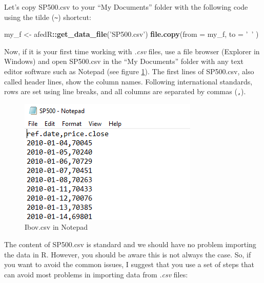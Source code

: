 \documentclass[
  12pt,
]{book}
\newenvironment{Shaded}{\begin{snugshade}}{\end{snugshade}}
\newcommand{\DataTypeTok}[1]{\textcolor[rgb]{0.27,0.27,0.27}{#1}}
\newcommand{\KeywordTok}[1]{\textcolor[rgb]{0.27,0.27,0.27}{\textbf{#1}}}
\newcommand{\NormalTok}[1]{#1}
\newcommand{\OperatorTok}[1]{\textcolor[rgb]{0.43,0.43,0.43}{\textbf{#1}}}
\newcommand{\StringTok}[1]{\textcolor[rgb]{0.5,0.5,0.5}{#1}}
\begin{document}
Let's copy SP500.csv to your ``My Documents'' folder with the following code using the tilde (\texttt{\textasciitilde{}}) shortcut:

\begin{Shaded}
\begin{Highlighting}[]
\NormalTok{my_f <-}\StringTok{ }\NormalTok{afedR}\OperatorTok{::}\KeywordTok{get_data_file}\NormalTok{(}\StringTok{'SP500.csv'}\NormalTok{)}
\KeywordTok{file.copy}\NormalTok{(}\DataTypeTok{from =}\NormalTok{ my_f, }\DataTypeTok{to =} \StringTok{'~'}\NormalTok{ )}
\end{Highlighting}
\end{Shaded}

Now, if it is your first time working with \emph{.csv} files, use a file browser (Explorer in Windows) and open SP500.csv in the ``My Documents'' folder with any text editor software such as Notepad (see figure \ref{fig:notepad}). The first lines of SP500.csv, also called header lines, show the column names. Following international standards, rows are set using line breaks, and all columns are separated by commas (\texttt{,}).

\begin{figure}[!htbp]

{\centering \includegraphics[width=1\linewidth]{figs/example_csv_notepad} 

}

\caption{Ibov.csv in Notepad}\label{fig:notepad}
\end{figure}

The content of SP500.csv is standard and we should have no problem importing the data in R. However, you should be aware this is not always the case. So, if you want to avoid the common issues, I suggest that you use a set of steps that can avoid most problems in importing data from \emph{.csv} files:
\end{document}
